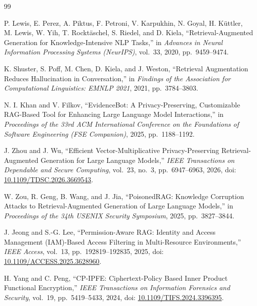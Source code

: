 \documentclass[10pt,a4paper]{article}
\begin{document}
\begin{thebibliography}{99}

 P. Lewis, E. Perez, A. Piktus, F. Petroni, V. Karpukhin, N. Goyal, H. K{\"u}ttler, M. Lewis, W. Yih, T. Rockt{\"a}schel, S. Riedel, and D. Kiela, ``Retrieval-Augmented Generation for Knowledge-Intensive NLP Tasks,'' in \textit{Advances in Neural Information Processing Systems (NeurIPS)}, vol.~33, 2020, pp.~9459--9474.

 K. Shuster, S. Poff, M. Chen, D. Kiela, and J. Weston, ``Retrieval Augmentation Reduces Hallucination in Conversation,'' in \textit{Findings of the Association for Computational Linguistics: EMNLP 2021}, 2021, pp.~3784--3803.

 N. I. Khan and V. Filkov, ``EvidenceBot: A Privacy-Preserving, Customizable RAG-Based Tool for Enhancing Large Language Model Interactions,'' in \textit{Proceedings of the 33rd ACM International Conference on the Foundations of Software Engineering (FSE Companion)}, 2025, pp.~1188--1192.

 J. Zhou and J. Wu, ``Efficient Vector-Multiplicative Privacy-Preserving Retrieval-Augmented Generation for Large Language Models,'' \textit{IEEE Transactions on Dependable and Secure Computing}, vol.~23, no.~3, pp.~6947--6963, 2026, doi: \href{https://doi.org/10.1109/TDSC.2026.3669543}{10.1109/TDSC.2026.3669543}.

 W. Zou, R. Geng, B. Wang, and J. Jia, ``PoisonedRAG: Knowledge Corruption Attacks to Retrieval-Augmented Generation of Large Language Models,'' in \textit{Proceedings of the 34th USENIX Security Symposium}, 2025, pp.~3827--3844.

 J. Jeong and S.-G. Lee, ``Permission-Aware RAG: Identity and Access Management (IAM)-Based Access Filtering in Multi-Resource Environments,'' \textit{IEEE Access}, vol.~13, pp.~192819--192835, 2025, doi: \href{https://doi.org/10.1109/ACCESS.2025.3628960}{10.1109/ACCESS.2025.3628960}.

 H. Yang and C. Peng, ``CP-IPFE: Ciphertext-Policy Based Inner Product Functional Encryption,'' \textit{IEEE Transactions on Information Forensics and Security}, vol.~19, pp.~5419--5433, 2024, doi: \href{https://doi.org/10.1109/TIFS.2024.3396395}{10.1109/TIFS.2024.3396395}.


\end{thebibliography}
\end{document}
